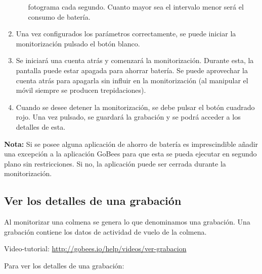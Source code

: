 \begin{enumerate}
\begin{itemize}
    fotograma cada segundo. Cuanto mayor sea el intervalo menor será el
    consumo de batería.
  \end{itemize}
\item
  Una vez configurados los parámetros correctamente, se puede iniciar la
  monitorización pulsado el botón blanco.
\item
  Se iniciará una cuenta atrás y comenzará la monitorización. Durante
  esta, la pantalla puede estar apagada para ahorrar batería. Se puede
  aprovechar la cuenta atrás para apagarla sin influir en la
  monitorización (al manipular el móvil siempre se producen
  trepidaciones).
\item
  Cuando se desee detener la monitorización, se debe pulsar el botón
  cuadrado rojo. Una vez pulsado, se guardará la grabación y se podrá
  acceder a los detalles de esta.
\end{enumerate}

\textbf{Nota:} Si se posee alguna aplicación de ahorro de batería es imprescindible
añadir una excepción a la aplicación GoBees para que esta se pueda
ejecutar en segundo plano sin restricciones. Si no, la aplicación puede
ser cerrada durante la monitorización.


\subsection{Ver los detalles de una
grabación}\label{ver-los-detalles-de-una-grabacion}

Al monitorizar una colmena se genera lo que denominamos una grabación.
Una grabación contiene los datos de actividad de vuelo de la colmena.

Video-tutorial: \url{http://gobees.io/help/videos/ver-grabacion}

Para ver los detalles de una grabación:


